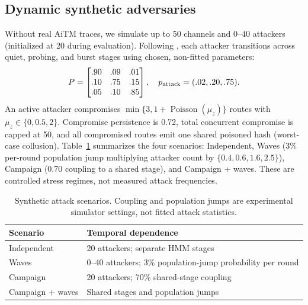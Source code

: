\documentclass[10pt,twocolumn]{article}
\begin{document}
\subsection{Dynamic synthetic adversaries}
Without real AiTM traces, we simulate up to 50 channels and $0\text{--}40$ attackers (initialized at 20 during evaluation). Following \citet{liao2020hmm}, each attacker transitions across quiet, probing, and burst stages using chosen, non-fitted parameters:
\begin{equation}\label{eq:hmm}
P=\begin{bmatrix}.90&.09&.01\\ .10&.75&.15\\ .05&.10&.85\end{bmatrix},\quad
p_{\rm attack}=(.02,.20,.75).
\end{equation}
An active attacker compromises $\min\{3,1+\operatorname{Poisson}(\mu_z)\}$ routes with $\mu_z\in\{0,0.5,2\}$. Compromise persistence is 0.72, total concurrent compromise is capped at 50, and all compromised routes emit one shared poisoned hash (worst-case collusion). Table~\ref{tab:scenarios} summarizes the four scenarios: Independent, Waves (3\% per-round population jump multiplying attacker count by $\{0.4,0.6,1.6,2.5\}$), Campaign (0.70 coupling to a shared stage), and Campaign + waves. These are controlled stress regimes, not measured attack frequencies.

\begin{table}[t]
\centering
\caption{Synthetic attack scenarios. Coupling and population jumps are experimental simulator settings, not fitted attack statistics.}
\label{tab:scenarios}
\footnotesize
\setlength{\tabcolsep}{3.6pt}
\begin{tabular}{@{}p{}p{}@{}}
\toprule
Scenario & Temporal dependence \\
\midrule
Independent & 20 attackers; separate HMM stages \\
Waves & 0--40 attackers; 3\% population-jump probability per round \\
Campaign & 20 attackers; 70\% shared-stage coupling \\
Campaign + waves & Shared stages and population jumps \\
\bottomrule
\end{tabular}
\end{table}
\end{document}
